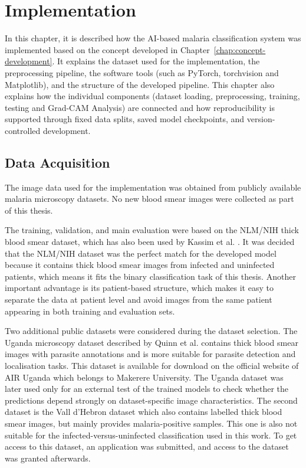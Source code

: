 \chapter{Implementation}
\label{chap:implementation}

In this chapter, it is described how the AI-based malaria classification system was implemented based on the concept developed in Chapter~\ref{chap:concept-development}. It explains the dataset used for the implementation, the preprocessing pipeline, the software tools (such as PyTorch, torchvision and Matplotlib), and the structure of the developed pipeline.
This chapter also explains how the individual components (dataset loading, preprocessing, training, testing and Grad-CAM Analysis) are connected and how reproducibility is supported through fixed data splits, saved model checkpoints, and version-controlled development.

\section{Data Acquisition}

The image data used for the implementation was obtained from publicly available malaria microscopy datasets. No new blood smear images were collected as part of this thesis. 

The training, validation, and main evaluation were based on the NLM/NIH thick blood smear dataset, which has also been used by Kassim et al. \cite{Kassim2021}. It was decided that the NLM/NIH dataset was the perfect match for the developed model because it contains thick blood smear images from infected and uninfected patients, which means it fits the binary classification task of this thesis. Another important advantage is its patient-based structure, which makes it easy to separate the data at patient level and avoid images from the same patient appearing in both training and evaluation sets.

Two additional public datasets were considered during the dataset selection. The Uganda microscopy dataset described by Quinn et al. \cite{Quinn2016} contains thick blood smear images with parasite annotations and is more suitable for parasite detection and localisation tasks. This dataset is available for download on the official website of AIR Uganda which belongs to Makerere University. The Uganda dataset was later used only for an external test of the trained models to check whether the predictions depend strongly on dataset-specific image characteristics. The second dataset is the Vall d'Hebron dataset \cite{VallHebron2025} which also contains labelled thick blood smear images, but mainly provides malaria-positive samples. This one is also not suitable for the infected-versus-uninfected classification used in this work. To get access to this dataset, an application was submitted, and access to the dataset was granted afterwards. 

